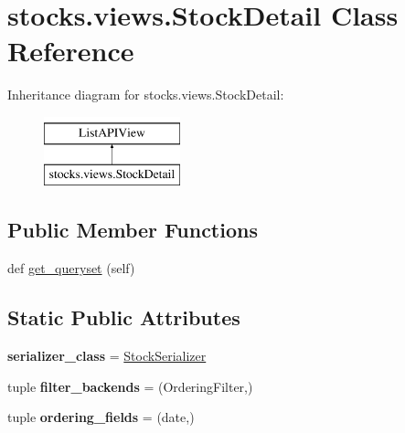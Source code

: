 \hypertarget{classstocks_1_1views_1_1_stock_detail}{}\section{stocks.\+views.\+Stock\+Detail Class Reference}
\label{classstocks_1_1views_1_1_stock_detail}
Inheritance diagram for stocks.\+views.\+Stock\+Detail\+:\begin{figure}[H]
\begin{center}
\leavevmode
\includegraphics[height=2.000000cm]{classstocks_1_1views_1_1_stock_detail}
\end{center}
\end{figure}
\subsection*{Public Member Functions}
\begin{DoxyCompactItemize}
\item 
def \mbox{\hyperlink{classstocks_1_1views_1_1_stock_detail_a0fbaf7ab1f9964d060dce21b915c9aab}{get\+\_\+queryset}} (self)
\end{DoxyCompactItemize}
\subsection*{Static Public Attributes}
\begin{DoxyCompactItemize}
\item 
\mbox{\label{classstocks_1_1views_1_1_stock_detail_aa723c51e7c9dfcca080fc9614637bec2}} 
{\bfseries serializer\+\_\+class} = \mbox{\hyperlink{classstocks_1_1serializers_1_1_stock_serializer}{Stock\+Serializer}}
\item 
\mbox{\label{classstocks_1_1views_1_1_stock_detail_a6f1c51a040f506a50051d156afe457df}} 
tuple {\bfseries filter\+\_\+backends} = (Ordering\+Filter,)
\item 
\mbox{\label{classstocks_1_1views_1_1_stock_detail_a425b2803ff8e77804ae2e0b9b2e964f7}} 
tuple {\bfseries ordering\+\_\+fields} = (\textquotesingle{}date\textquotesingle{},)
\end{DoxyCompactItemize}


